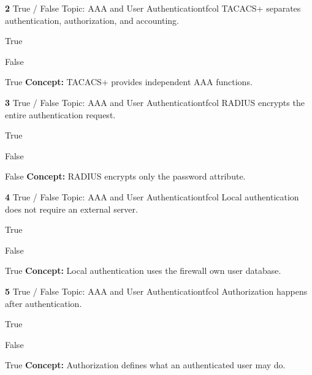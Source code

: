 \documentclass[10pt,a4paper]{article}
\begin{document}
\begin{qcard}{\color{white}\textbf{2} \hfill \small True / False \textbar{} Topic: AAA and User Authentication}{tfcol}
TACACS+ separates authentication, authorization, and accounting.

\begin{qoptions}
\item True
\item False
\end{qoptions}
\begin{explainbox}{True}
\textbf{Concept:} TACACS+ provides independent AAA functions.
\end{explainbox}
\end{qcard}

\begin{qcard}{\color{white}\textbf{3} \hfill \small True / False \textbar{} Topic: AAA and User Authentication}{tfcol}
RADIUS encrypts the entire authentication request.

\begin{qoptions}
\item True
\item False
\end{qoptions}
\begin{explainbox}{False}
\textbf{Concept:} RADIUS encrypts only the password attribute.
\end{explainbox}
\end{qcard}

\begin{qcard}{\color{white}\textbf{4} \hfill \small True / False \textbar{} Topic: AAA and User Authentication}{tfcol}
Local authentication does not require an external server.

\begin{qoptions}
\item True
\item False
\end{qoptions}
\begin{explainbox}{True}
\textbf{Concept:} Local authentication uses the firewall own user database.
\end{explainbox}
\end{qcard}

\begin{qcard}{\color{white}\textbf{5} \hfill \small True / False \textbar{} Topic: AAA and User Authentication}{tfcol}
Authorization happens after authentication.

\begin{qoptions}
\item True
\item False
\end{qoptions}
\begin{explainbox}{True}
\textbf{Concept:} Authorization defines what an authenticated user may do.
\end{explainbox}
\end{qcard}
\end{document}
